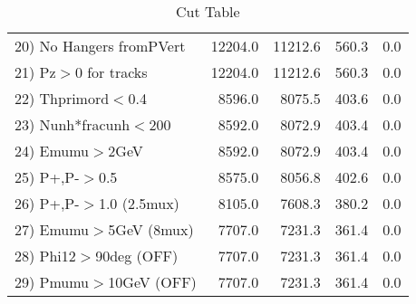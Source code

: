 \begin{table}[h!]
\begin{tabular}{||l||r|r|r|r||}
 20) No Hangers fromPVert &     12204.0 &     11212.6 &       560.3 &         0.0 \\
 21) Pz$>$0 for tracks    &     12204.0 &     11212.6 &       560.3 &         0.0 \\
 22) Thprimord$<$0.4      &      8596.0 &      8075.5 &       403.6 &         0.0 \\
 23) Nunh*fracunh$<$200   &      8592.0 &      8072.9 &       403.4 &         0.0 \\
 24) Emumu$>$2GeV         &      8592.0 &      8072.9 &       403.4 &         0.0 \\
 25) P+,P-$>$0.5          &      8575.0 &      8056.8 &       402.6 &         0.0 \\
 26) P+,P-$>$1.0 (2.5mux) &      8105.0 &      7608.3 &       380.2 &         0.0 \\
 27) Emumu$>$5GeV  (8mux) &      7707.0 &      7231.3 &       361.4 &         0.0 \\
 28) Phi12$>$90deg  (OFF) &      7707.0 &      7231.3 &       361.4 &         0.0 \\
 29) Pmumu$>$10GeV  (OFF) &      7707.0 &      7231.3 &       361.4 &         0.0 \\
 \hline
 \hline
 \end{tabular}
 \caption{Cut Table \cohrp  }
 \label{tab-cut_crhop}
 \end{table}
